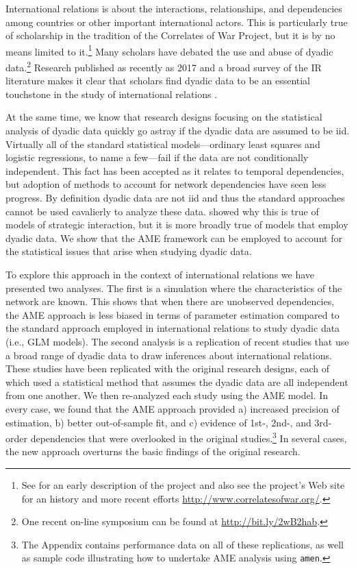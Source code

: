 International relations is about the interactions, relationships, and dependencies among countries or other important international actors. This is particularly true of scholarship in the tradition of the Correlates of War Project, but it is by no means limited to it.\footnote{See \cite{singer:1972} for an early description of the project and also see the project's Web site for an history and more recent efforts \url{http://www.correlatesofwar.org/}.} Many scholars have debated the use and abuse of dyadic data.\footnote{One recent on-line symposium can be found at \url{http://bit.ly/2wB2hab}.} Research published as recently as 2017 and a broad survey of the IR literature makes it clear that scholars find dyadic data to be an essential touchstone in the study of international relations \citep{erikson:pinto:2014,aronow:etal:2015}.

At the same time, we know that research designs focusing on the statistical analysis of dyadic data quickly go astray if the dyadic data are assumed to be iid.  Virtually all of the standard statistical models---ordinary least squares and logistic regressions, to name a few---fail if the data are not conditionally independent. This fact has been accepted as it relates to temporal dependencies, but adoption of methods to account for network dependencies have seen less progress. By definition dyadic data are not iid and thus the standard approaches cannot be used cavalierly to analyze these data.  \citet{signorino:1999} showed why this is true of models of strategic interaction, but it is more broadly true of models that employ dyadic data.  We show that the AME framework can be employed to account for the statistical issues that arise when studying dyadic data.

To explore this approach in the context of international relations we have presented two analyses. The first is a simulation where the characteristics of the network are known. This shows that when there are unobserved dependencies, the AME approach is less biased in terms of parameter estimation compared to the standard approach employed in international relations to study dyadic data (i.e., GLM models). The second analysis is a replication of recent studies that use a broad range of dyadic data to draw inferences about international relations.  These studies have been replicated with the original research designs, each of which used a statistical method that assumes the dyadic data are all independent from one another.  We then re-analyzed each study using the AME model.  In every case, we found that the AME approach provided a) increased precision of estimation, b) better out-of-sample fit, and c) evidence of 1st-, 2nd-, and 3rd-order dependencies that were overlooked in the original studies.\footnote{The Appendix contains performance data on all of these replications, as well as sample code illustrating how to undertake AME analysis using \texttt{amen}.} In several cases, the new approach overturns the basic findings of the original research.

